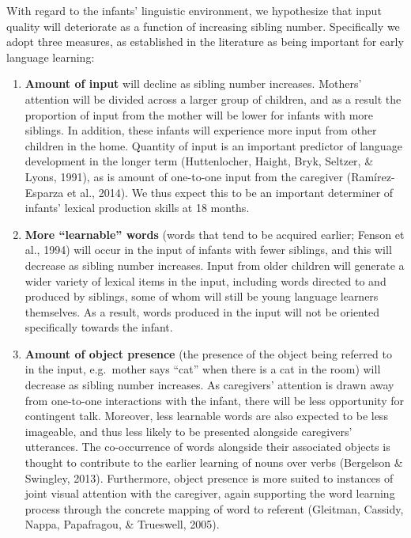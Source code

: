 \documentclass[man,floatsintext]{apa6}
\begin{document}
With regard to the infants' linguistic environment, we hypothesize that input quality will deteriorate as a function of increasing sibling number. Specifically we adopt three measures, as established in the literature as being important for early language learning:

\begin{enumerate}
\def\labelenumi{\arabic{enumi})}
\item
  \textbf{Amount of input} will decline as sibling number increases. Mothers' attention will be divided across a larger group of children, and as a result the proportion of input from the mother will be lower for infants with more siblings. In addition, these infants will experience more input from other children in the home. Quantity of input is an important predictor of language development in the longer term (Huttenlocher, Haight, Bryk, Seltzer, \& Lyons, 1991), as is amount of one-to-one input from the caregiver (Ramírez-Esparza et al., 2014). We thus expect this to be an important determiner of infants' lexical production skills at 18 months.
\item
  \textbf{More \enquote{learnable} words} (words that tend to be acquired earlier; Fenson et al., 1994) will occur in the input of infants with fewer siblings, and this will decrease as sibling number increases. Input from older children will generate a wider variety of lexical items in the input, including words directed to and produced by siblings, some of whom will still be young language learners themselves. As a result, words produced in the input will not be oriented specifically towards the infant.
\item
  \textbf{Amount of object presence} (the presence of the object being referred to in the input, e.g.~mother says \enquote{cat} when there is a cat in the room) will decrease as sibling number increases. As caregivers' attention is drawn away from one-to-one interactions with the infant, there will be less opportunity for contingent talk. Moreover, less learnable words are also expected to be less imageable, and thus less likely to be presented alongside caregivers' utterances. The co-occurrence of words alongside their associated objects is thought to contribute to the earlier learning of nouns over verbs (Bergelson \& Swingley, 2013). Furthermore, object presence is more suited to instances of joint visual attention with the caregiver, again supporting the word learning process through the concrete mapping of word to referent (Gleitman, Cassidy, Nappa, Papafragou, \& Trueswell, 2005).
\end{enumerate}
\end{document}
